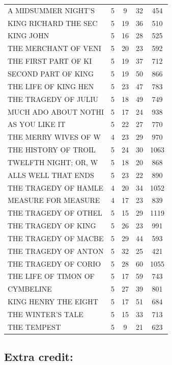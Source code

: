 \documentclass{article}\usepackage[]{graphicx}\usepackage[]{color}
\begin{document}
\begin{table}[H]
\begin{tabular}{lcccc}
  A MIDSUMMER NIGHT'S  &   5 &   9 &  32 & 454 \\ 
  KING RICHARD THE SEC &   5 &  19 &  36 & 510 \\ 
  KING JOHN &   5 &  16 &  28 & 525 \\ 
  THE MERCHANT OF VENI &   5 &  20 &  23 & 592 \\ 
  THE FIRST PART OF KI &   5 &  19 &  37 & 712 \\ 
  SECOND PART OF KING  &   5 &  19 &  50 & 866 \\ 
  THE LIFE OF KING HEN &   5 &  23 &  47 & 783 \\ 
  THE TRAGEDY OF JULIU &   5 &  18 &  49 & 749 \\ 
  MUCH ADO ABOUT NOTHI &   5 &  17 &  24 & 938 \\ 
  AS YOU LIKE IT &   5 &  22 &  27 & 770 \\ 
  THE MERRY WIVES OF W &   4 &  23 &  29 & 970 \\ 
  THE HISTORY OF TROIL &   5 &  24 &  30 & 1063 \\ 
  TWELFTH NIGHT; OR, W &   5 &  18 &  20 & 868 \\ 
  ALLS WELL THAT ENDS  &   5 &  23 &  22 & 890 \\ 
  THE TRAGEDY OF HAMLE &   4 &  20 &  34 & 1052 \\ 
  MEASURE FOR MEASURE &   4 &  17 &  23 & 839 \\ 
  THE TRAGEDY OF OTHEL &   5 &  15 &  29 & 1119 \\ 
  THE TRAGEDY OF KING  &   5 &  26 &  23 & 991 \\ 
  THE TRAGEDY OF MACBE &   5 &  29 &  44 & 593 \\ 
  THE TRAGEDY OF ANTON &   5 &  32 &  25 & 421 \\ 
  THE TRAGEDY OF CORIO &   5 &  28 &  60 & 1055 \\ 
  THE LIFE OF TIMON OF &   5 &  17 &  59 & 743 \\ 
  CYMBELINE &   5 &  27 &  39 & 801 \\ 
  KING HENRY THE EIGHT &   5 &  17 &  51 & 684 \\ 
  THE WINTER'S TALE &   5 &  15 &  33 & 713 \\ 
  THE TEMPEST &   5 &   9 &  21 & 623 \\ 
   \hline
\end{tabular}
\end{table}


\subsection{Extra credit:} %
\end{document}
